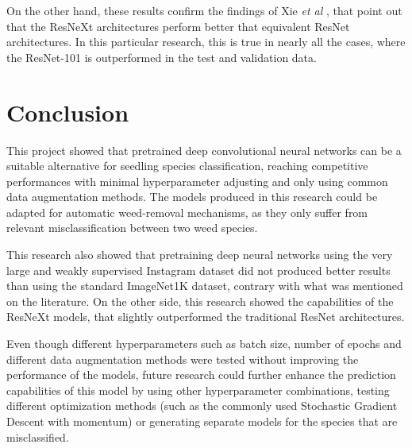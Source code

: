 \documentclass[10pt,onecolumn,titlepage,letterpaper]{article}
\begin{document}
On the other hand, these results confirm the findings of Xie \textit{et al} \cite{Xie2017}, that point out that the ResNeXt architectures perform better that equivalent ResNet architectures. In this particular research, this is true in nearly all the cases, where the ResNet-101 is outperformed in the test and validation data.

\section{Conclusion}

This project showed that pretrained deep convolutional neural networks can be a suitable alternative for seedling species classification, reaching competitive performances with minimal hyperparameter adjusting and only using common data augmentation methods. The models produced in this research could be adapted for automatic weed-removal mechanisms, as they only suffer from relevant misclassification between two weed species.

This research also showed that pretraining deep neural networks using the very large and weakly supervised Instagram dataset did not produced better results than using the standard ImageNet1K dataset, contrary with what was mentioned on the literature. On the other side, this research showed the capabilities of the ResNeXt models, that slightly outperformed the traditional ResNet architectures.

Even though different hyperparameters such as batch size, number of epochs and different data augmentation methods were tested without improving the performance of the models, future research could further enhance the prediction capabilities of this model by using other hyperparameter combinations, testing different optimization methods (such as the commonly used Stochastic Gradient Descent with momentum) or generating separate models for the species that are misclassified.


{\small


}
\end{document}

